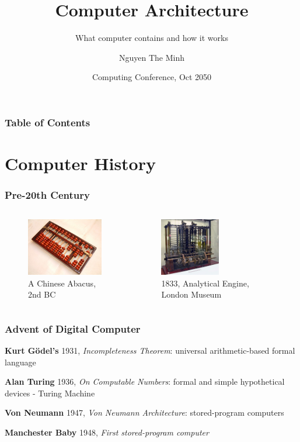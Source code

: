 \documentclass{beamer}
\title{Computer Architecture}
\subtitle{What computer contains and how it works}
\author{Nguyen The Minh}
\institute{Electronics and Computer Science Home}
\date{Computing Conference, Oct 2050}
\begin{document}
\frame{\titlepage}

\begin{frame}
\frametitle{Table of Contents}
\tableofcontents
\end{frame}

\section{Computer History}
\begin{frame}
\frametitle{Pre-20th Century}

\begin{columns}
\begin{figure}[h!]
  \includegraphics[height=2.5cm]{img/abacus.jpeg}
    \caption{A Chinese Abacus, 2nd BC}
\end{figure}
\begin{figure}[h!]
  \includegraphics[height=2.5cm]{img/AnalyticalMachine.jpg}
    \caption{1833, Analytical Engine, London Museum}
\end{figure}
\end{columns}

\end{frame}

\begin{frame}
\frametitle{Advent of Digital Computer}

\textbf{Kurt Gödel's} 1931, \textit{Incompleteness Theorem}: universal arithmetic-based formal language \pause

\textbf{Alan Turing} 1936, \textit{On Computable Numbers}:  formal and simple hypothetical devices - Turing Machine  \pause

\textbf{Von Neumann} 1947, \textit{Von Neumann Architecture}: stored-program computers \pause

\textbf{Manchester Baby} 1948, \textit{First stored-program computer} 

\end{frame}
\end{document}
